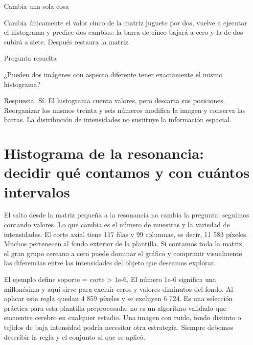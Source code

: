 
\begin{Practica}{Cambia una sola cosa}

Cambia únicamente el valor cinco de la matriz juguete por dos, vuelve a ejecutar el histograma y predice dos cambios: la barra de cinco bajará a cero y la de dos subirá a siete. Después restaura la matriz.


\end{Practica}


\begin{Idea}{Pregunta resuelta}

¿Pueden dos imágenes con aspecto diferente tener exactamente el mismo histograma?


Respuesta. Sí. El histograma cuenta valores, pero descarta sus posiciones. Reorganizar los mismos treinta y seis números modifica la imagen y conserva las barras. La distribución de intensidades no sustituye la información espacial.


\end{Idea}

\clearpage

\section{Histograma de la resonancia: decidir qué contamos y con cuántos intervalos}


El salto desde la matriz pequeña a la resonancia no cambia la pregunta: seguimos contando valores. Lo que cambia es el número de muestras y la variedad de intensidades. El corte axial tiene 117 filas y 99 columnas, es decir, 11 583 píxeles. Muchos pertenecen al fondo exterior de la plantilla. Si contamos toda la matriz, el gran grupo cercano a cero puede dominar el gráfico y comprimir visualmente las diferencias entre las intensidades del objeto que deseamos explorar.


El ejemplo define soporte = corte > 1e-6. El número 1e-6 significa una millonésima y aquí sirve para excluir ceros y valores diminutos del fondo. Al aplicar esta regla quedan 4 859 píxeles y se excluyen 6 724. Es una selección práctica para esta plantilla preprocesada; no es un algoritmo validado que encuentre cerebro en cualquier estudio. Una imagen con ruido, fondo distinto o tejidos de baja intensidad podría necesitar otra estrategia. Siempre debemos describir la regla y el conjunto al que se aplicó.


